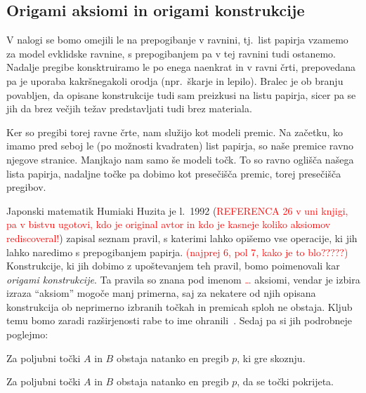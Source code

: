 \subsection{Origami aksiomi in origami konstrukcije}

V nalogi se bomo omejili le na prepogibanje v ravnini, tj.\ list papirja vzamemo za model evklidske ravnine, s prepogibanjem pa v tej ravnini tudi ostanemo. Nadalje pregibe konsktruiramo le po enega naenkrat in v ravni črti, prepovedana pa je uporaba kakršnegakoli orodja (npr.\ škarje in lepilo).  Bralec je ob branju povabljen, da opisane konstrukcije tudi sam preizkusi na listu papirja, sicer pa se jih da brez večjih težav predstavljati tudi brez materiala.

Ker so pregibi torej ravne črte, nam služijo kot modeli premic. Na začetku, ko imamo pred seboj le (po možnosti kvadraten) list papirja, so naše premice ravno njegove stranice. Manjkajo nam samo še modeli točk. To so ravno oglišča našega lista papirja, nadaljne točke pa dobimo kot presečišča premic, torej presečišča pregibov.

Japonski matematik Humiaki Huzita je l.\ 1992 (\textcolor{red}{REFERENCA 26 v uni knjigi, pa v bistvu ugotovi, kdo je original avtor in kdo je kasneje koliko aksiomov rediscoveral!}) zapisal seznam pravil, s katerimi lahko opišemo vse operacije, ki jih lahko naredimo s prepogibanjem papirja. \textcolor{red}{(najprej 6, pol 7, kako je to blo?????)} Konstrukcije, ki jih dobimo z upoštevanjem teh pravil, bomo poimenovali kar \emph{origami konstrukcije}. Ta pravila so znana pod imenom \textcolor{red}{\ldots} aksiomi, vendar je izbira izraza ``aksiom'' mogoče manj primerna, saj za nekatere od njih opisana konstrukcija ob neprimerno izbranih točkah in premicah sploh ne obstaja. Kljub temu bomo zaradi razširjenosti rabe to ime ohranili~\cite[str.\ 7]{zore2022}. Sedaj pa si jih podrobneje poglejmo:

\renewcommand{\theaksiom}{O\arabic{aksiom}}

\begin{aksiom}
    \label{aks:O1}
    Za poljubni točki $A$ in $B$ obstaja natanko en pregib $p$, ki gre skoznju.
\end{aksiom}
\begin{aksiom}
    \label{aks:O2}
    Za poljubni točki $A$ in $B$ obstaja natanko en pregib $p$, da se točki pokrijeta.
\end{aksiom}


